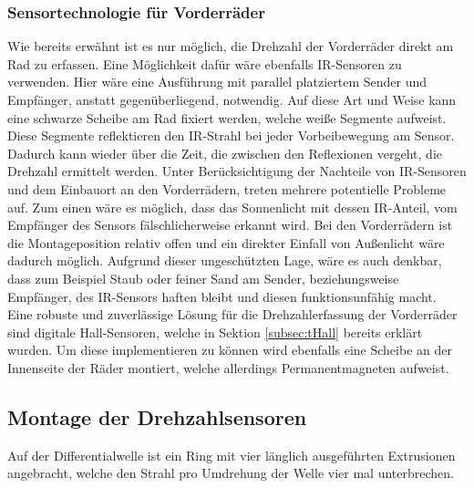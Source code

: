 \subsubsection{Sensortechnologie für Vorderräder}
\label{subsubsec:RPMchoiceFront}
Wie bereits erwähnt ist es nur möglich, die Drehzahl der Vorderräder direkt am Rad zu erfassen. Eine Möglichkeit dafür wäre ebenfalls \ac{IR}-Sensoren zu verwenden. Hier wäre eine Ausführung mit parallel platziertem Sender und Empfänger, anstatt gegenüberliegend, notwendig. Auf diese Art und Weise kann eine schwarze Scheibe am Rad fixiert werden, welche weiße Segmente aufweist. Diese Segmente reflektieren den \ac{IR}-Strahl bei jeder Vorbeibewegung am Sensor. Dadurch kann wieder über die Zeit, die zwischen den Reflexionen vergeht, die Drehzahl ermittelt werden. Unter Berücksichtigung der Nachteile von \ac{IR}-Sensoren und dem Einbauort an den Vorderrädern, treten mehrere potentielle Probleme auf. Zum einen wäre es möglich, dass das Sonnenlicht mit dessen \ac{IR}-Anteil, vom Empfänger des Sensors fälschlicherweise erkannt wird. Bei den Vorderrädern ist die Montageposition relativ offen und ein direkter Einfall von Außenlicht wäre dadurch möglich. Aufgrund dieser ungeschützten Lage, wäre es auch denkbar, dass zum Beispiel Staub oder feiner Sand am Sender, beziehungsweise Empfänger, des \ac{IR}-Sensors haften bleibt und diesen funktionsunfähig macht.\\
Eine robuste und zuverlässige Lösung für die Drehzahlerfassung der Vorderräder sind digitale Hall-Sensoren, welche in Sektion \ref{subsec:tHall} bereits erklärt wurden. Um diese implementieren zu können wird ebenfalls eine Scheibe an der Innenseite der Räder montiert, welche allerdings Permanentmagneten aufweist.



\subsection{Montage der Drehzahlsensoren}
Auf der Differentialwelle ist ein Ring mit vier länglich ausgeführten Extrusionen angebracht, welche den Strahl pro Umdrehung der Welle vier mal unterbrechen.
